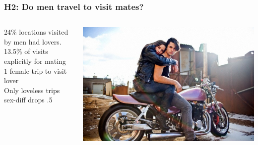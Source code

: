 \documentclass{beamer}
\begin{document}
\begin{frame}
\frametitle{H2: Do men travel to visit mates?}

\begin{columns}
\begin{column}{.6\textwidth}
24\% locations visited by men had lovers. \\
\vspace{0.75cm} 
13.5\% of visits explicitly for mating \\
\vspace{0.75cm} 
1 female trip to visit lover \\
\vspace{0.75cm} 
Only loveless trips sex-diff drops .5 \\
\vspace{0.75cm} 
\end{column}

\begin{column}{.4\textwidth}
\includegraphics[width=1\linewidth]{travelmate}
\end{column}

\end{columns}

\end{frame}

\end{document}
